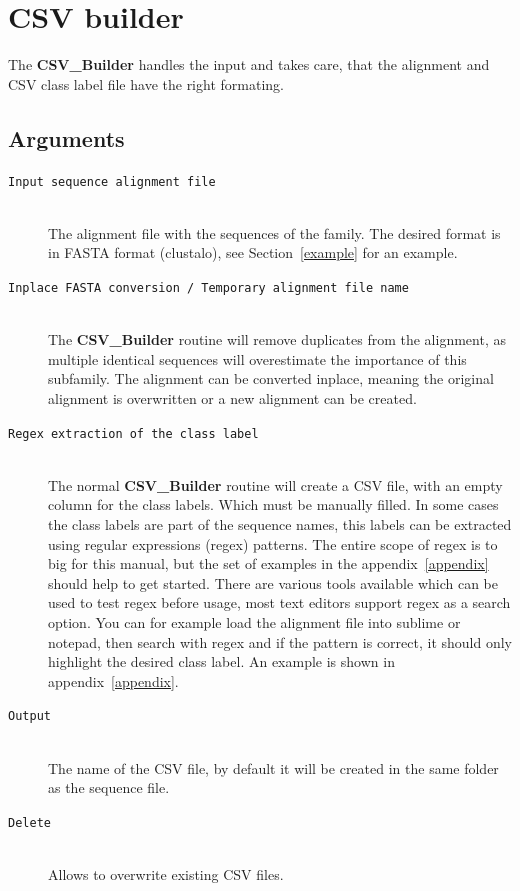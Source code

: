 \documentclass[a4paper,10pt]{article}
\begin{document}
\section{CSV builder} \label{csv_b}

The \textbf{CSV\_Builder} handles the input and takes care, 
that the alignment and CSV class label file have the right formating.

\subsection{Arguments}

\begin{description}

\item[\texttt{Input sequence alignment file}] \hfill \\
 
The alignment file with the sequences of the family.
The desired format is in FASTA format (clustalo), see Section~\ref{example}
for an example.

\item[\texttt{Inplace FASTA conversion / Temporary alignment file name}] \hfill \\
 
The \textbf{CSV\_Builder} routine will remove duplicates from the 
alignment, as multiple identical sequences will overestimate the importance
of this subfamily. The alignment can be converted inplace, meaning
the original alignment is overwritten or a new alignment can be 
created.

\item[\texttt{Regex extraction of the class label}] \hfill \\
 
The normal \textbf{CSV\_Builder} routine will create a CSV file,
with an empty column for the class labels. Which must be manually 
filled.
In some cases the class labels are part of the sequence names,
this labels can be extracted using regular expressions (regex) patterns.
The entire scope of regex is to big for this manual, but the set of
examples in the appendix~\ref{appendix} should help to get started. There are various 
tools available which can be used to test regex before usage, most text editors 
support regex as a search option. You can 
for example load the alignment file into sublime or notepad, then
search with regex and if the pattern is correct, it should only highlight 
the desired class label. An example is shown in appendix~\ref{appendix}.

\item[\texttt{Output}] \hfill \\

The name of the CSV file, by default it will be created in the same folder as
the sequence file.

\item[\texttt{Delete}] \hfill \\

Allows to overwrite existing CSV files.

\end{description}
\end{document}
